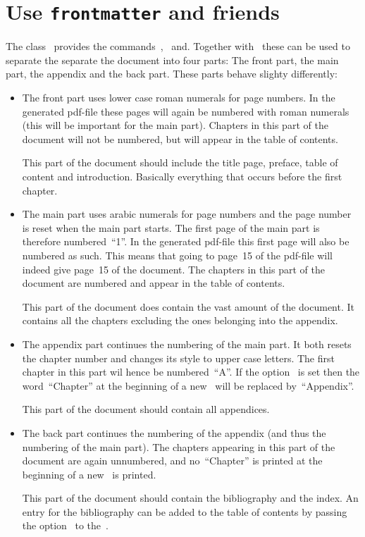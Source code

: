 \section{Use \texttt{{\tbs}frontmatter} and friends}
\label{using frontmatter}

The class~ provides the commands~,~ and.
Together with~ these can be used to separate the separate the document into four parts:
The front part, the main part, the appendix and the back part.
These parts behave slighty differently:
\begin{itemize}
  \item
    The front part uses lower case roman numerals for page numbers.
    In the generated pdf-file these pages will again be numbered with roman numerals (this will be important for the main part).
    Chapters in this part of the document will not be numbered, but will appear in the table of contents.
    
    This part of the document should include the title page, preface, table of content and introduction.
    Basically everything that occurs before the first chapter.
  \item
    The main part uses arabic numerals for page numbers and the page number is reset when the main part starts.
    The first page of the main part is therefore numbered~\enquote{1}.
    In the generated pdf-file this first page will also be numbered as such.
    This means that going to page~15 of the pdf-file will indeed give page~15 of the document.
    The chapters in this part of the document are numbered and appear in the table of contents.
    
    This part of the document does contain the vast amount of the document.
    It contains all the chapters excluding the ones belonging into the appendix.
  \item
    The appendix part continues the numbering of the main part.
    It both resets the chapter number and changes its style to upper case letters.
    The first chapter in this part wil hence be numbered~\enquote{A}.
    If the option~ is set then the word~\enquote{Chapter} at the beginning of a new~ will be replaced by~\enquote{Appendix}.
    
    This part of the document should contain all appendices.
  \item
    The back part continues the numbering of the appendix (and thus the numbering of the main part).
    The chapters appearing in this part of the document are again unnumbered, and no~\enquote{Chapter} is printed at the beginning of a new~ is printed.
    
    This part of the document should contain the bibliography and the index.
    An entry for the bibliography can be added to the table of contents by passing the option~ to the~.
\end{itemize}

